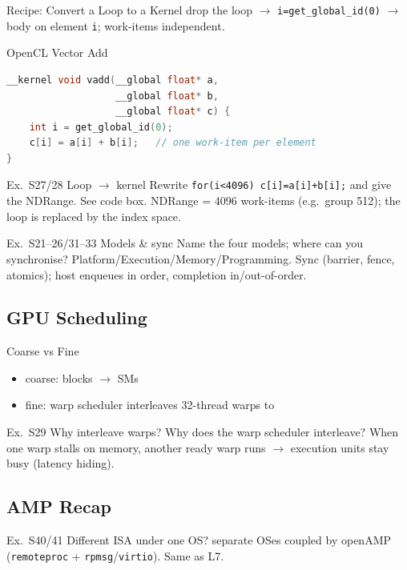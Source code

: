 \multend

\begin{KR}{Recipe: Convert a Loop to a Kernel}
    drop the loop $\to$ \texttt{i=get\_global\_id(0)} $\to$ body on element \texttt{i}; work-items independent.
\end{KR}

\begin{examplecode}{OpenCL Vector Add}
\begin{lstlisting}[language=C, style=basesmol]
__kernel void vadd(__global float* a,
                   __global float* b,
                   __global float* c) {
    int i = get_global_id(0);
    c[i] = a[i] + b[i];   // one work-item per element
}
\end{lstlisting}
\end{examplecode}

\begin{example2}{Ex.\ S27/28 Loop $\to$ kernel}
    Rewrite \texttt{for(i<4096) c[i]=a[i]+b[i];} and give the NDRange.
    \tcblower
    See code box. NDRange = 4096 work-items (e.g.\ group 512); the loop is replaced by the index space.
\end{example2}

\begin{example2}{Ex.\ S21--26/31--33 Models \& sync}
    Name the four models; where can you synchronise?
    \tcblower
    Platform/Execution/Memory/Programming. Sync  (barrier, fence, atomics); host enqueues in order, completion in/out-of-order.
\end{example2}

\subsection{GPU Scheduling}

\begin{concept}{Coarse vs Fine}
    \begin{itemize}
        \item coarse: blocks $\to$ SMs
        \item fine: warp scheduler interleaves 32-thread warps to 
    \end{itemize}
\end{concept}

\begin{example2}{Ex.\ S29 Why interleave warps?}
    Why does the warp scheduler interleave?
    \tcblower
    When one warp stalls on memory, another ready warp runs $\to$ execution units stay busy (latency hiding).
\end{example2}

\subsection{AMP Recap}

\begin{example2}{Ex.\ S40/41 Different ISA under one OS?}
    \tcblower
     separate OSes coupled by openAMP (\texttt{remoteproc} + \texttt{rpmsg}/\texttt{virtio}). Same as L7.
\end{example2}
